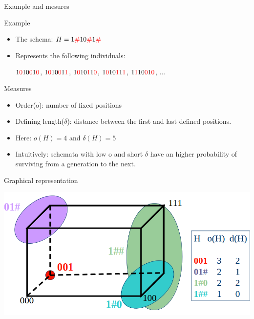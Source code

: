 \begin{frame}{Example and mesures}
  \begin{block}{Example}
    \begin{itemize}
    \item The schema: $H = 1\textcolor{red}{\#}10\textcolor{red}{\#}1\textcolor{red}{\#}$
    \item Represents the following individuals:
      \begin{center}
        $1\textcolor{red}{0}10\textcolor{red}{0}1\textcolor{red}{0}$,
        $1\textcolor{red}{0}10\textcolor{red}{0}1\textcolor{red}{1}$,
        $1\textcolor{red}{0}10\textcolor{red}{1}1\textcolor{red}{0}$,
        $1\textcolor{red}{0}10\textcolor{red}{1}1\textcolor{red}{1}$,
        $1\textcolor{red}{1}10\textcolor{red}{0}1\textcolor{red}{0}$,
        $\ldots$
      \end{center}
    \end{itemize}
  \end{block}

  \begin{block}{Measures}
    \begin{itemize}
      \item Order(o): number of fixed positions
      \item Defining length($\delta$): distance between the first and last defined positions.
      \item Here: $o(H) = 4$ and $\delta(H) = 5$
      \item Intuitively: schemata with low o and short $\delta$ have an higher probability of surviving from a generation to the next.
    \end{itemize}
  \end{block}
\end{frame}

\begin{frame}{Graphical representation}
  \begin{center}
    \includegraphics[scale=.4]{img/schema}
  \end{center}
\end{frame}

